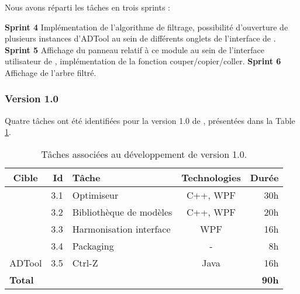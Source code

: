             Nous avons réparti les tâches en trois sprints :

            \noindent\textbf{Sprint 4} Implémentation de l'algorithme de filtrage, possibilité d'ouverture de plusieurs instances d'ADTool au sein de différents onglets de l'interface de \glasir{}.\newline 
            \textbf{Sprint 5} Affichage du panneau relatif à ce module au sein de l'interface utilisateur de \glasir{}, implémentation de la fonction couper/copier/coller.\newline %
            \textbf{Sprint 6} Affichage de l'arbre filtré.

        \subsubsection{Version 1.0}
            Quatre tâches ont été identifiées pour la version 1.0 de \glasir{}, présentées dans la {\sc Table} \ref{tab:taches_units_3}.
            \begin{table}[h]
                \centering
                \begin{tabular}{|c|r|l|c|r|}
                    \hline
                    \textbf{Cible} & \textbf{Id} & \textbf{Tâche} & \textbf{Technologies} & \textbf{Durée}\\
                    \hline

                    \multirow{4}{*}{\glasir{}} & 3.1 & Optimiseur & C++, WPF & 30h\\
                    \cline{2-5}
                     & 3.2 & Bibliothèque de modèles & C++, WPF & 20h\\
                    \cline{2-5}
                     & 3.3 & Harmonisation interface & WPF & 16h\\
                    \cline{2-5}
                     & 3.4 & Packaging & - & 8h\\
                    \hline

                    \multirow{1}{*}{ADTool} & 3.5 & Ctrl-Z & \multirow{1}{*}{Java} & 16h\\
                    \hline

                    \multicolumn{4}{|l|}{\bf Total} & {\bf 90h}\\
                    \hline
                \end{tabular}
                \caption{Tâches associées au développement de \glasir{} version 1.0.}
                \label{tab:taches_units_3}
            \end{table}
            
